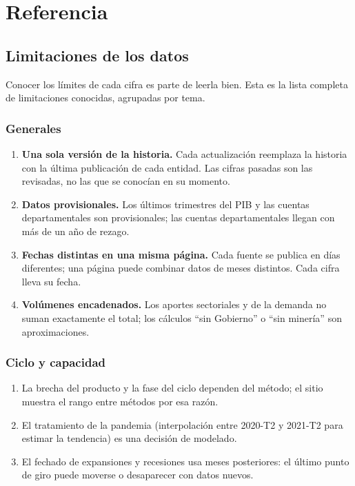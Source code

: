 \part{Referencia}

\chapter{Limitaciones de los datos}
\label{es:r:limitaciones}

Conocer los límites de cada cifra es parte de leerla bien. Esta es la lista completa de limitaciones conocidas,
agrupadas por tema.

\section{Generales}
\begin{enumerate}
\item \textbf{Una sola versión de la historia.} Cada actualización reemplaza la historia con la última publicación de
  cada entidad. Las cifras pasadas son las revisadas, no las que se conocían en su momento.
\item \textbf{Datos provisionales.} Los últimos trimestres del PIB y las cuentas departamentales son provisionales;
  las cuentas departamentales llegan con más de un año de rezago.
\item \textbf{Fechas distintas en una misma página.} Cada fuente se publica en días diferentes; una página puede
  combinar datos de meses distintos. Cada cifra lleva su fecha.
\item \textbf{Volúmenes encadenados.} Los aportes sectoriales y de la demanda no suman exactamente el total; los
  cálculos ``sin Gobierno'' o ``sin minería'' son aproximaciones.
\end{enumerate}

\section{Ciclo y capacidad}
\begin{enumerate}
\item La brecha del producto y la fase del ciclo dependen del método; el sitio muestra el rango entre métodos por esa
  razón.
\item El tratamiento de la pandemia (interpolación entre 2020-T2 y 2021-T2 para estimar la tendencia) es una decisión
  de modelado.
\item El fechado de expansiones y recesiones usa meses posteriores: el último punto de giro puede moverse o desaparecer
  con datos nuevos.
\end{enumerate}

